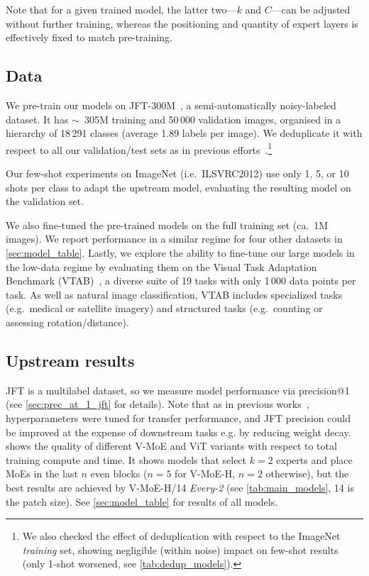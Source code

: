 \documentclass{article}
\newcommand{\abbv}{{V-MoE}}
\begin{document}
Note that for a given trained model, the latter two---$k$ and $C$---can be adjusted without further training, whereas the positioning and quantity of expert layers is effectively fixed to match pre-training.


\subsection{Data}\label{sect:data}
We pre-train our models on JFT-300M~\cite{sun2017revisiting}, a semi-automatically noisy-labeled dataset. 
It has $\sim$~305M training and 50\,000 validation images,
organised in a hierarchy of 18\,291 classes (average 1.89 labels per image). We deduplicate it with respect to all our validation/test sets as in previous efforts~\cite{kolesnikov2019big}.\footnote{We also checked the effect of deduplication with respect to the ImageNet \textit{training} set, showing negligible (within noise) impact on few-shot results (only 1-shot worsened, see \cref{tab:dedup_models}).}

Our few-shot experiments on ImageNet (i.e.\ ILSVRC2012) use only 1, 5, or 10 shots per class to adapt the upstream model, evaluating the resulting model on the validation set.

We also fine-tuned the pre-trained models on the full training set (ca.\ 1M images).
We report performance in a similar regime for four other datasets in
\cref{sec:model_table}. Lastly, we explore the ability to fine-tune our large models in the low-data regime by evaluating
them on the Visual Task Adaptation Benchmark (VTAB)~\cite{zhai2019largescale}, 
a diverse suite of 19 tasks with only 1\,000 data points per task.
As well as natural image classification, VTAB includes specialized tasks (e.g.\ medical or satellite imagery) and structured tasks 
(e.g.\ counting or assessing rotation/distance).


\subsection{Upstream results}
JFT is a multilabel dataset, so we measure model performance via precision@1 (see \cref{sec:prec_at_1_jft} for details). Note that as in previous works~\cite{dosovitskiy2020image}, hyperparameters were tuned for transfer performance, and JFT precision could be improved at the expense of downstream tasks e.g. by reducing weight decay.
 shows the quality of different \abbv{} and ViT variants with respect to total training compute and time.
It shows models that select $k=2$ experts and place MoEs in the last $n$ even blocks 
($n=5$ for \abbv{}-H, $n=2$ otherwise), but the best results are achieved by \abbv{}-H/14 \emph{Every-2} (see \cref{tab:main_models}, 14 is the patch size). 
See \cref{sec:model_table} for results of all models.
\end{document}
